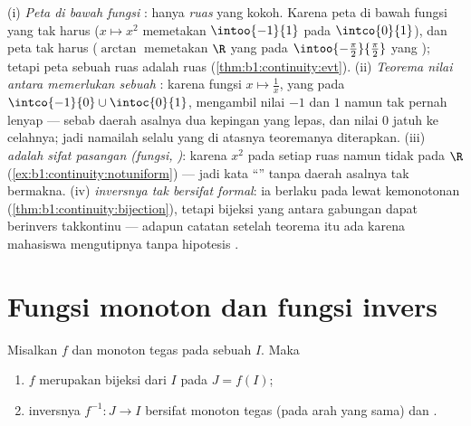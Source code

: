 \begin{remark}
(i) \emph{Peta di bawah fungsi }: hanya \emph{ruas} yang kokoh.
Karena peta   di bawah fungsi yang  tak harus 
($x \mapsto x^2$ memetakan $\intoo{-1}{1}$ pada $\intco{0}{1}$), dan
peta  tak harus  ($\arctan$ memetakan
$\R$ yang  pada $\intoo{-\frac\pi2}{\frac\pi2}$ yang
); tetapi peta sebuah ruas adalah
ruas (\cref{thm:b1:continuity:evt}). (ii) \emph{Teorema
nilai antara memerlukan sebuah }: karena fungsi $x
\mapsto \frac1x$, yang  pada $\intco{-1}{0} \cup
\intoc{0}{1}$, mengambil nilai $-1$ dan $1$ namun tak pernah
lenyap --- sebab daerah asalnya dua kepingan yang lepas, dan nilai
$0$ jatuh ke celahnya; jadi namailah selalu  yang di atasnya
teoremanya diterapkan. (iii) \emph{ adalah sifat
pasangan (fungsi, )}: karena $x^2$  pada setiap
ruas namun tidak pada $\R$
(\cref{ex:b1:continuity:notuniform}) --- jadi kata ``'' tanpa daerah asalnya tak bermakna. (iv)
\emph{ inversnya tak bersifat formal}: ia berlaku pada
 lewat kemonotonan
(\cref{thm:b1:continuity:bijection}), tetapi bijeksi yang 
antara gabungan  dapat berinvers takkontinu ---
adapun catatan setelah teorema itu ada karena mahasiswa mengutipnya
tanpa hipotesis .
\end{remark}

\section{Fungsi monoton dan fungsi invers}

\begin{theorem}\label{thm:b1:continuity:bijection}
Misalkan $f$  dan monoton tegas pada sebuah  $I$. Maka
\begin{enumerate}
  \item $f$ merupakan bijeksi dari $I$ pada  $J = f(I)$;
  \item inversnya $f^{-1} \colon J \to I$ bersifat monoton tegas (pada
        arah yang sama) dan \emph{}.
\end{enumerate}
\end{theorem}


